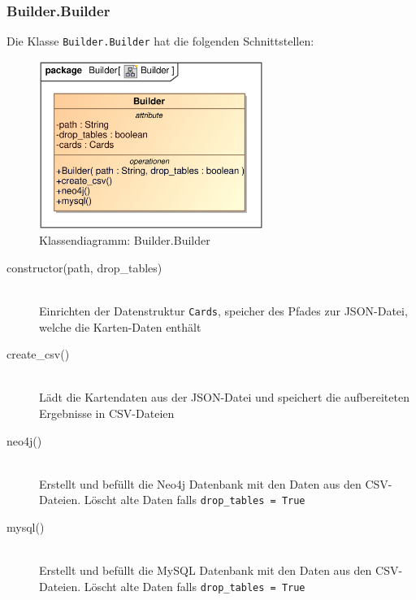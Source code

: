 \subsubsection{Builder.Builder}
Die Klasse \verb|Builder.Builder| hat die folgenden Schnittstellen:
\begin{figure}[H]
    \myfloatalign
    \includegraphics[width=0.65\textwidth]{gfx/MtGDeepAnalysis/Builder.eps}
    \caption{Klassendiagramm: Builder.Builder}
    \label{fig:class:builder.builder}
\end{figure}
\begin{description}
    \item[constructor(path, drop\_tables)] \hfill \\
    Einrichten der Datenstruktur \verb|Cards|, speicher des Pfades zur \ac{JSON}-Datei, welche die Karten-Daten enthält
    
    \item[create\_csv()] \hfill \\
    Lädt die Kartendaten aus der \ac{JSON}-Datei und speichert die aufbereiteten Ergebnisse in \ac{CSV}-Dateien
    
    \item[neo4j()] \hfill \\
    Erstellt und befüllt die Neo4j Datenbank mit den Daten aus den \ac{CSV}-Dateien. Löscht alte Daten falls \verb|drop_tables = True|
    
    \item[mysql()] \hfill \\
    Erstellt und befüllt die MySQL Datenbank mit den Daten aus den \ac{CSV}-Dateien. Löscht alte Daten falls \verb|drop_tables = True|
\end{description}

